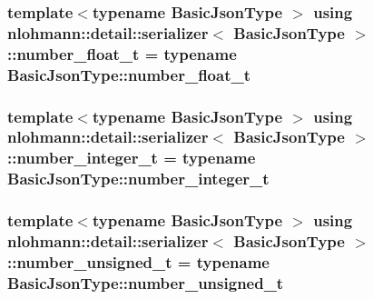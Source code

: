 \subsubsection[{\texorpdfstring{number\+\_\+float\+\_\+t}{number_float_t}}]{\setlength{\rightskip}{0pt plus 5cm}template$<$typename Basic\+Json\+Type $>$ using {\bf nlohmann\+::detail\+::serializer}$<$ Basic\+Json\+Type $>$\+::{\bf number\+\_\+float\+\_\+t} =  typename Basic\+Json\+Type\+::number\+\_\+float\+\_\+t\hspace{0.3cm}{\ttfamily [private]}}\hypertarget{classnlohmann_1_1detail_1_1serializer_a460c6794fbabbb2ae83380e987a6c030}{}\label{classnlohmann_1_1detail_1_1serializer_a460c6794fbabbb2ae83380e987a6c030}
\subsubsection[{\texorpdfstring{number\+\_\+integer\+\_\+t}{number_integer_t}}]{\setlength{\rightskip}{0pt plus 5cm}template$<$typename Basic\+Json\+Type $>$ using {\bf nlohmann\+::detail\+::serializer}$<$ Basic\+Json\+Type $>$\+::{\bf number\+\_\+integer\+\_\+t} =  typename Basic\+Json\+Type\+::number\+\_\+integer\+\_\+t\hspace{0.3cm}{\ttfamily [private]}}\hypertarget{classnlohmann_1_1detail_1_1serializer_ae7b1df1c70bdec1371f297567726a198}{}\label{classnlohmann_1_1detail_1_1serializer_ae7b1df1c70bdec1371f297567726a198}
\subsubsection[{\texorpdfstring{number\+\_\+unsigned\+\_\+t}{number_unsigned_t}}]{\setlength{\rightskip}{0pt plus 5cm}template$<$typename Basic\+Json\+Type $>$ using {\bf nlohmann\+::detail\+::serializer}$<$ Basic\+Json\+Type $>$\+::{\bf number\+\_\+unsigned\+\_\+t} =  typename Basic\+Json\+Type\+::number\+\_\+unsigned\+\_\+t\hspace{0.3cm}{\ttfamily [private]}}\hypertarget{classnlohmann_1_1detail_1_1serializer_a16c7b7a726a38ff0c06dce7ba7968391}{}\label{classnlohmann_1_1detail_1_1serializer_a16c7b7a726a38ff0c06dce7ba7968391}
